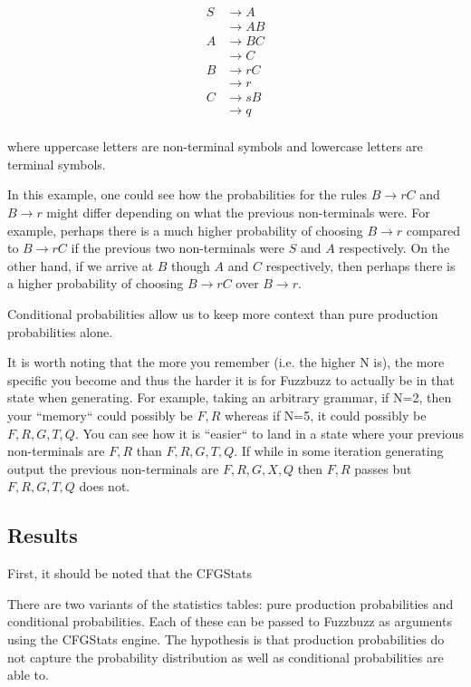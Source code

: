 \begin{align*}
S &\rightarrow A \\
&\rightarrow A B \\
A &\rightarrow B C \\
&\rightarrow C \\
B &\rightarrow r C \\
&\rightarrow r \\
C &\rightarrow s B \\
&\rightarrow q \\
\end{align*}

\noindent
where uppercase letters are non-terminal symbols and lowercase letters are
terminal symbols.


In this example, one could see how the probabilities for the rules $B
\rightarrow rC$ and $B \rightarrow r$ might differ depending on what the
previous non-terminals were. For example, perhaps there is a much higher
probability of choosing $B \rightarrow r$ compared to $B \rightarrow rC$ if the
previous two non-terminals were $S$ and $A$ respectively. On the other hand, if
we arrive at $B$ though $A$ and $C$ respectively, then perhaps there is a
higher probability of choosing $B \rightarrow rC$ over $B \rightarrow r$.

Conditional probabilities allow us to keep more context than pure production
probabilities alone.

It is worth noting that the more you remember (i.e. the higher N is), the more
specific you become and thus the harder it is for Fuzzbuzz to actually be in
that state when generating. For example, taking an arbitrary grammar, if N=2,
then your ``memory`` could possibly be $F, R$ whereas if N=5, it could possibly
be $F, R, G, T, Q$. You can see how it is ``easier`` to land in a state where
your previous non-terminals are $F, R$ than $F, R, G, T, Q$. If while in some
iteration generating output the previous non-terminals are $F, R, G, X, Q$ then
$F, R$ passes but $F, R, G, T, Q$ does not.

\subsection{Results}

First, it should be noted that the CFGStats

There are two variants of the statistics tables: pure production probabilities
and conditional probabilities. Each of these can be passed to Fuzzbuzz as
arguments using the CFGStats engine. The hypothesis is that production
probabilities do not capture the probability distribution as well as
conditional probabilities are able to.

